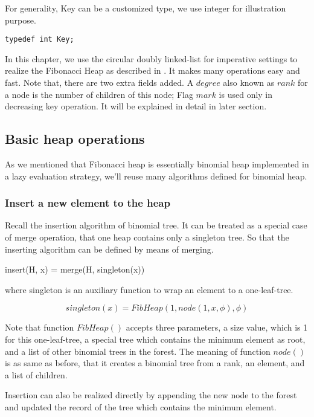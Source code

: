 \documentclass{article}
\begin{document}
For generality, Key can be a customized type, we use integer for illustration
purpose.

\lstset{language=C}
\begin{lstlisting}
typedef int Key;
\end{lstlisting}

In this chapter, we use the circular doubly linked-list for imperative
settings to realize the Fibonacci Heap as described in \cite{CLRS}.
It makes many operations easy and fast. Note that, there are two extra
fields added. A $degree$ also known as $rank$ for a node is the number
of children of this node; Flag $mark$ is used only in decreasing key
operation. It will be explained in detail in later section.


\subsection{Basic heap operations}
As we mentioned that Fibonacci heap is essentially binomial heap
implemented in a lazy evaluation strategy, we'll reuse many algorithms
defined for binomial heap.

\subsubsection{Insert a new element to the heap}
Recall the insertion algorithm of binomial tree. It can be treated
as a special case of merge operation, that one heap contains only
a singleton tree. So that the inserting algorithm can be defined
by means of merging.

\be
insert(H, x) = merge(H, singleton(x))
\label{eq:fib-insert}
\ee

where singleton is an auxiliary function to wrap an element to a
one-leaf-tree.

\[
singleton(x) = FibHeap(1, node(1, x, \phi), \phi)
\]

Note that function $FibHeap()$ accepts three parameters, a
size value, which is 1 for this one-leaf-tree, a special tree
which contains the minimum element as root, and a list of other
binomial trees in the forest. The meaning of function $node()$ is
as same as before, that it creates a binomial tree from a rank,
an element, and a list of children.

Insertion can also be realized directly by appending the new node
to the forest and updated the record of the tree which contains the
minimum element.
\end{document}
